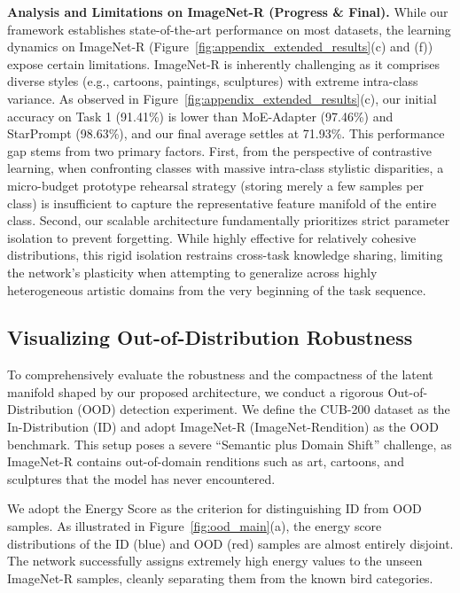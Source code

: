 \documentclass[journal]{IEEEtran}
\theoremstyle{plain}
\theoremstyle{definition}
\theoremstyle{remark}
\begin{document}
\textbf{Analysis and Limitations on ImageNet-R (Progress \& Final).} 
While our framework establishes state-of-the-art performance on most datasets, the learning dynamics on ImageNet-R (Figure~\ref{fig:appendix_extended_results}(c) and (f)) expose certain limitations. ImageNet-R is inherently challenging as it comprises diverse styles (e.g., cartoons, paintings, sculptures) with extreme intra-class variance. As observed in Figure~\ref{fig:appendix_extended_results}(c), our initial accuracy on Task 1 (91.41\%) is lower than MoE-Adapter (97.46\%) and StarPrompt (98.63\%), and our final average settles at 71.93\%. 
This performance gap stems from two primary factors. First, from the perspective of contrastive learning, when confronting classes with massive intra-class stylistic disparities, a micro-budget prototype rehearsal strategy (storing merely a few samples per class) is insufficient to capture the representative feature manifold of the entire class. Second, our scalable architecture fundamentally prioritizes strict parameter isolation to prevent forgetting. While highly effective for relatively cohesive distributions, this rigid isolation restrains cross-task knowledge sharing, limiting the network's plasticity when attempting to generalize across highly heterogeneous artistic domains from the very beginning of the task sequence.


\subsection{Visualizing Out-of-Distribution Robustness}
\label{sec:ood_robustness}

To comprehensively evaluate the robustness and the compactness of the latent manifold shaped by our proposed architecture, we conduct a rigorous Out-of-Distribution (OOD) detection experiment. We define the CUB-200 dataset as the In-Distribution (ID) and adopt ImageNet-R (ImageNet-Rendition) as the OOD benchmark. This setup poses a severe ``Semantic plus Domain Shift'' challenge, as ImageNet-R contains out-of-domain renditions such as art, cartoons, and sculptures that the model has never encountered.

We adopt the Energy Score as the criterion for distinguishing ID from OOD samples. As illustrated in Figure~\ref{fig:ood_main}(a), the energy score distributions of the ID (blue) and OOD (red) samples are almost entirely disjoint. The network successfully assigns extremely high energy values to the unseen ImageNet-R samples, cleanly separating them from the known bird categories. 
\end{document}
